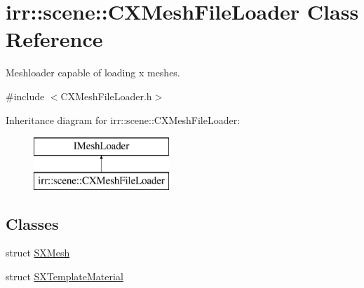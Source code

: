 \hypertarget{classirr_1_1scene_1_1_c_x_mesh_file_loader}{\section{irr\-:\-:scene\-:\-:C\-X\-Mesh\-File\-Loader Class Reference}
\label{classirr_1_1scene_1_1_c_x_mesh_file_loader}
}


Meshloader capable of loading x meshes.  




{\ttfamily \#include $<$C\-X\-Mesh\-File\-Loader.\-h$>$}

Inheritance diagram for irr\-:\-:scene\-:\-:C\-X\-Mesh\-File\-Loader\-:\begin{figure}[H]
\begin{center}
\leavevmode
\includegraphics[height=2.000000cm]{classirr_1_1scene_1_1_c_x_mesh_file_loader}
\end{center}
\end{figure}
\subsection*{Classes}
\begin{DoxyCompactItemize}
\item 
struct \hyperlink{structirr_1_1scene_1_1_c_x_mesh_file_loader_1_1_s_x_mesh}{S\-X\-Mesh}
\item 
struct \hyperlink{structirr_1_1scene_1_1_c_x_mesh_file_loader_1_1_s_x_template_material}{S\-X\-Template\-Material}
\end{DoxyCompactItemize}
